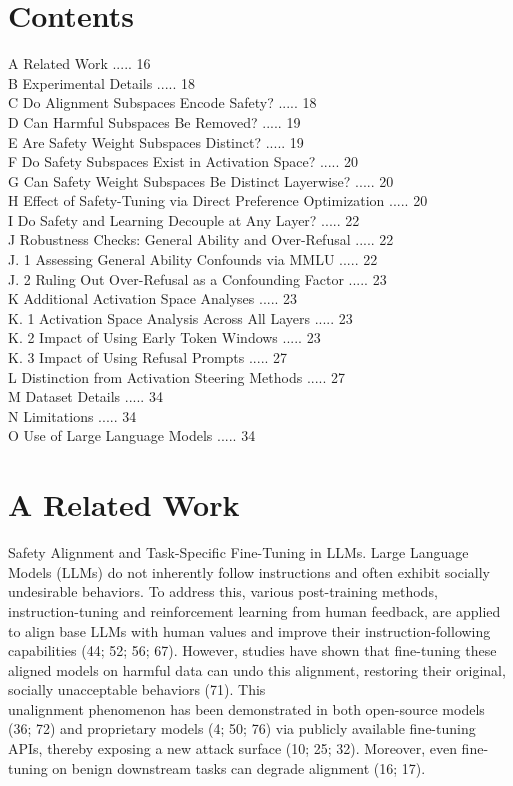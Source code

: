 \documentclass[10pt]{article}
\begin{document}
\section*{Contents}
A Related Work ..... 16\\
B Experimental Details ..... 18\\
C Do Alignment Subspaces Encode Safety? ..... 18\\
D Can Harmful Subspaces Be Removed? ..... 19\\
E Are Safety Weight Subspaces Distinct? ..... 19\\
F Do Safety Subspaces Exist in Activation Space? ..... 20\\
G Can Safety Weight Subspaces Be Distinct Layerwise? ..... 20\\
H Effect of Safety-Tuning via Direct Preference Optimization ..... 20\\
I Do Safety and Learning Decouple at Any Layer? ..... 22\\
J Robustness Checks: General Ability and Over-Refusal ..... 22\\
J. 1 Assessing General Ability Confounds via MMLU ..... 22\\
J. 2 Ruling Out Over-Refusal as a Confounding Factor ..... 23\\
K Additional Activation Space Analyses ..... 23\\
K. 1 Activation Space Analysis Across All Layers ..... 23\\
K. 2 Impact of Using Early Token Windows ..... 23\\
K. 3 Impact of Using Refusal Prompts ..... 27\\
L Distinction from Activation Steering Methods ..... 27\\
M Dataset Details ..... 34\\
N Limitations ..... 34\\
O Use of Large Language Models ..... 34

\section*{A Related Work}
Safety Alignment and Task-Specific Fine-Tuning in LLMs. Large Language Models (LLMs) do not inherently follow instructions and often exhibit socially undesirable behaviors. To address this, various post-training methods, instruction-tuning and reinforcement learning from human feedback, are applied to align base LLMs with human values and improve their instruction-following capabilities (44; 52; 56; 67). However, studies have shown that fine-tuning these aligned models on harmful data can undo this alignment, restoring their original, socially unacceptable behaviors (71). This\\
unalignment phenomenon has been demonstrated in both open-source models (36; 72) and proprietary models (4; 50; 76) via publicly available fine-tuning APIs, thereby exposing a new attack surface (10; 25; 32). Moreover, even fine-tuning on benign downstream tasks can degrade alignment (16; 17).
\end{document}
